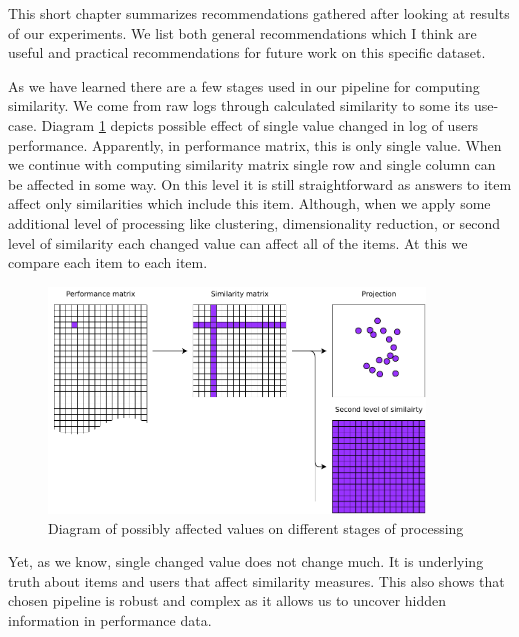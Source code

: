 \documentclass[
  digital, %
  table,   %
  nolof,     %
  nolot,     %
  nocover,
  color,
  final, %
]{fithesis3}
\begin{document}


This short chapter summarizes recommendations gathered after looking at results of our experiments. We list both general recommendations which I think are useful and practical recommendations for future work on this specific dataset.


As we have learned there are a few stages used in our pipeline for computing similarity. We come from raw logs through calculated similarity to some its use-case. Diagram \ref{fig:affected_diagram} depicts possible effect of single value changed in log of users performance. Apparently, in performance matrix, this is only single value. When we continue with computing similarity matrix single row and single column can be affected in some way. On this level it is still straightforward as answers to item affect only similarities which include this item. Although, when we apply some additional level of processing like clustering, dimensionality reduction, or second level of similarity each changed value can affect all of the items. At this we compare each item to each item.

\begin{figure}
  \includegraphics[width=10cm]{img/affected_diagram}
  \caption{Diagram of possibly affected values on different stages of processing}
  \label{fig:affected_diagram}
\end{figure}

Yet, as we know, single changed value does not change much. It is underlying truth about items and users that affect similarity measures. This also shows that chosen pipeline is robust and complex as it allows us to uncover hidden information in performance data.
\end{document}
